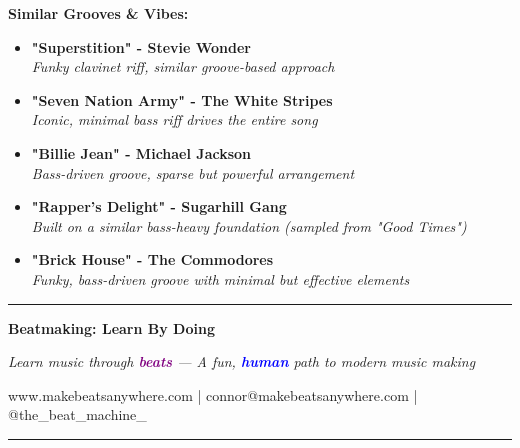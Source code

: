\documentclass[11pt,letterpaper]{article}
\newcommand{\purple}[1]{\textcolor{purple}{\textbf{#1}}}
\newcommand{\bluepurple}[1]{\textcolor{blue}{\textbf{#1}}}
\begin{document}
\begin{tcolorbox}[colback=blue!5,colframe=blue,width=\textwidth,arc=3mm,boxrule=1pt]
\textbf{Similar Grooves \& Vibes:}

\begin{itemize}[leftmargin=*, itemsep=0.3em]
\item \textbf{"Superstition" - Stevie Wonder} \\
    \textit{Funky clavinet riff, similar groove-based approach}
    
\item \textbf{"Seven Nation Army" - The White Stripes} \\
    \textit{Iconic, minimal bass riff drives the entire song}
    
\item \textbf{"Billie Jean" - Michael Jackson} \\
    \textit{Bass-driven groove, sparse but powerful arrangement}
    
\item \textbf{"Rapper's Delight" - Sugarhill Gang} \\
    \textit{Built on a similar bass-heavy foundation (sampled from "Good Times")}
    
\item \textbf{"Brick House" - The Commodores} \\
    \textit{Funky, bass-driven groove with minimal but effective elements}
\end{itemize}
\end{tcolorbox}

\vspace{1cm}

\begin{center}
\rule{0.8\textwidth}{0.5pt}

\vspace{0.3cm}

\textbf{Beatmaking: Learn By Doing}

\textit{Learn music through \purple{beats} — A fun, \bluepurple{human} path to modern music making}

\vspace{0.3cm}

\small www.makebeatsanywhere.com | connor@makebeatsanywhere.com | @the\_beat\_machine\_

\vspace{0.3cm}

\rule{0.8\textwidth}{0.5pt}
\end{center}
\end{document}
